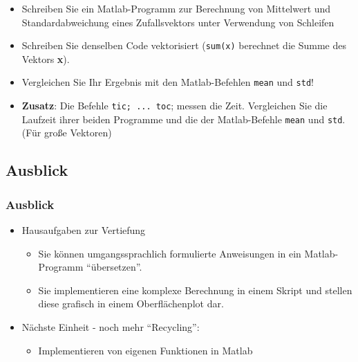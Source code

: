       \secMexercise
      \begin{frame}
          \frameMexercise
          \begin{exercise}
              \sloppy
              \begin{itemize}
                \item Schreiben Sie ein Matlab-Programm zur Berechnung von Mittelwert und Standardabweichung eines Zufallsvektors unter Verwendung von Schleifen
                \item Schreiben Sie denselben Code vektorisiert (\texttt{sum(x)} berechnet die Summe des Vektors \textbf{x}).
                \item Vergleichen Sie Ihr Ergebnis mit den Matlab-Befehlen \texttt{mean} und \texttt{std}!
                \item \textbf{Zusatz}: Die Befehle \texttt{tic; ... toc}; messen die Zeit. Vergleichen Sie die Laufzeit ihrer beiden Programme und die der
                Matlab-Befehle \texttt{mean} und \texttt{std}. (Für große Vektoren)
              \end{itemize}
          \end{exercise}
      \end{frame}

      \subsection{Ausblick}
      \begin{frame}
          \frametitle{Ausblick}
          \begin{itemize}
            \item Hausaufgaben zur Vertiefung
            \begin{itemize}
              \item Sie können umgangssprachlich formulierte Anweisungen in ein Matlab-Programm ``übersetzen''.
              \item Sie implementieren eine komplexe Berechnung in einem Skript und stellen diese grafisch in einem Oberflächenplot dar.
            \end{itemize}
            \item Nächste Einheit - noch mehr ``Recycling'':
            \begin{itemize}
              \item Implementieren von eigenen Funktionen in Matlab
            \end{itemize}
          \end{itemize}
      \end{frame}



